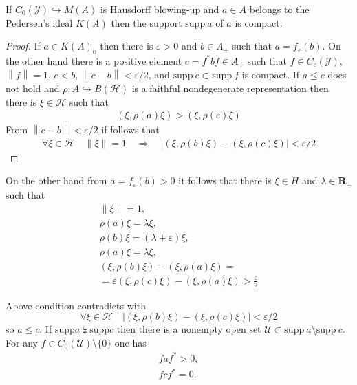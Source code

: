 \documentclass{beamer}
\theoremstyle{plain}
\newcommand{\eps}{\varepsilon}                    %
\newcommand{\supp}{\mathrm{supp}}
\newcommand{\sU}{\mathcal{U}}       %
\newcommand{\sY}{\mathcal{Y}}       %
\newcommand{\la}{\lambda}
\renewcommand{\H}{\mathcal{H}}               %
\newcommand{\bean}{\begin{eqnarray*}}
\newcommand{\eean}{\end{eqnarray*}}
\newcommand{\hookto}{\hookrightarrow}        %
\begin{document}
\begin{frame}
	\begin{lemma}\label{blowing_pedersen_compact_lem}
		If  $C_0\left( \sY\right)\hookto M\left( A\right)$ is Hausdorff blowing-up and $a\in A$ belongs to the Pedersen's ideal $K\left(A \right)$  then the support $\supp~a$ of $a$  is compact.
	\end{lemma}
\begin{proof}	
If $a \in K\left(A\right)_0$  then  there is $\eps > 0$ and $b \in A_+$ such that $a = f_\eps \left( b\right)$. On the other hand  there is a positive element  $c= f^*bf\in  A_+$  such that  $f\in C_c\left(\sY \right)$, $\left\|f \right\|=1 $, $c < b$, $\left\|c - b \right\|  < \eps/2$, and $\supp~ c\subset \supp ~f$ is compact.
If $a \le c$ does not hold and $\rho: A \hookto B\left(\H \right)$ is a faithful  nondegenerate representation  then there is $\xi \in \H$ such that
\bean
 \left( \xi, \rho\left( a \right) \xi\right) > \left( \xi, \rho\left( c \right) \xi\right)
\eean
From $\left\|c - b \right\|  < \eps/2$ if follows that
\bean
\forall \xi \in \H  \quad \left\| \xi \right\| = 1\quad \Rightarrow\quad  \left|\left( \xi, \rho\left( b \right) \xi\right)-\left( \xi, \rho\left( c \right) \xi\right) \right| < \eps/2
\eean
\end{proof}

\end{frame}
\begin{frame}
On the other hand from $a =f_\eps \left( b\right)> 0$ it follows that there is $\xi \in H$ and $\la \in \mathbf{R}_+$ such that
\bean
\left\| \xi \right\| = 1,\\
\rho\left(a \right) \xi = \la \xi,\\
\rho\left(b \right)\xi = \left( \la+\eps \right) \xi,\\
\rho\left(a \right)\xi = \la  \xi,\\
\left( \xi, \rho\left( b \right) \xi\right) - \left( \xi, \rho\left( a \right) \xi\right)= \\=\eps
\left( \xi, \rho\left( c \right) \xi\right)- \left( \xi, \rho\left( a \right) \xi\right)> \frac{\eps}{2}
\eean

Above condition contradicts with
$$
\forall \xi\in \H \quad\left|\left( \xi, \rho\left( b \right) \xi\right)-\left( \xi, \rho\left( c \right) \xi\right) \right| < \eps/2
$$
so $a \le c$.
If $\supp a \subsetneqq \supp c$ then there is a nonempty  open set  $\sU \subset \supp~ a\setminus \supp~ c$. For any $f \in C_0\left(\sU \right)\setminus \{0\}$ one has
\bean
faf^* > 0,\\
fcf^* = 0.
\eean
\end{frame}
\end{document}
